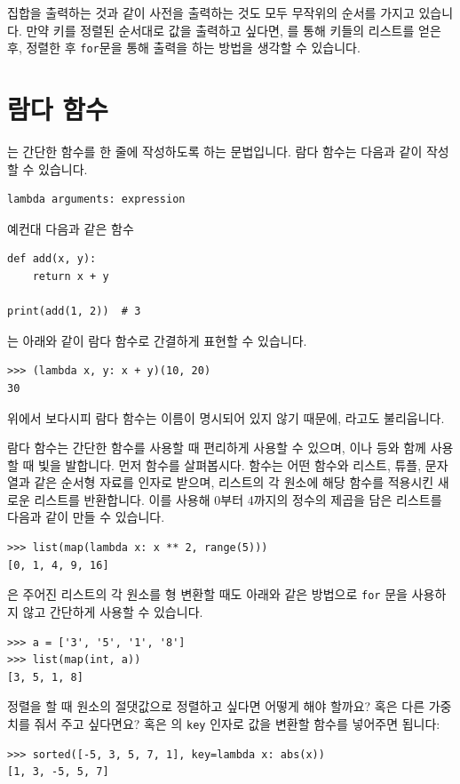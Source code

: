 \documentclass[../main.tex]{subfiles}
\begin{document}
집합을 출력하는 것과 같이 사전을 출력하는 것도 모두 무작위의 순서를 가지고 있습니다.
만약 키를 정렬된 순서대로 값을 출력하고 싶다면, 를 통해 키들의 리스트를 얻은 후, 정렬한 후 \texttt{for}문을 통해 출력을 하는 방법을 생각할 수 있습니다.

\section{람다 함수}
는 간단한 함수를 한 줄에 작성하도록 하는 문법입니다.
람다 함수는 다음과 같이 작성할 수 있습니다.
\begin{verbatim}
lambda arguments: expression
\end{verbatim}
예컨대 다음과 같은 함수
\begin{verbatim}
def add(x, y):
    return x + y

print(add(1, 2))  # 3
\end{verbatim}
는 아래와 같이 람다 함수로 간결하게 표현할 수 있습니다.
\begin{verbatim}
>>> (lambda x, y: x + y)(10, 20)
30
\end{verbatim}
위에서 보다시피 람다 함수는 이름이 명시되어 있지 않기 때문에, 라고도 불리웁니다.

람다 함수는 간단한 함수를 사용할 때 편리하게 사용할 수 있으며, 이나 등와 함께 사용할 때 빛을 발합니다.
먼저  함수를 살펴봅시다.
 함수는 어떤 함수와 리스트, 튜플, 문자열과 같은 순서형 자료를 인자로 받으며, 리스트의 각 원소에 해당 함수를 적용시킨 새로운 리스트를 반환합니다.
이를 사용해 0부터 4까지의 정수의 제곱을 담은 리스트를 다음과 같이 만들 수 있습니다.
\begin{verbatim}
>>> list(map(lambda x: x ** 2, range(5)))
[0, 1, 4, 9, 16]
\end{verbatim}
은 주어진 리스트의 각 원소를 형 변환할 때도 아래와 같은 방법으로 \texttt{for} 문을 사용하지 않고 간단하게 사용할 수 있습니다.
\begin{verbatim}
>>> a = ['3', '5', '1', '8']
>>> list(map(int, a))
[3, 5, 1, 8]
\end{verbatim}

정렬을 할 때 원소의 절댓값으로 정렬하고 싶다면 어떻게 해야 할까요?
혹은 다른 가중치를 줘서 주고 싶다면요?
 혹은 의 \verb/key/ 인자로 값을 변환할 함수를 넣어주면 됩니다:

\begin{verbatim}
>>> sorted([-5, 3, 5, 7, 1], key=lambda x: abs(x))
[1, 3, -5, 5, 7]
\end{verbatim}
\end{document}
